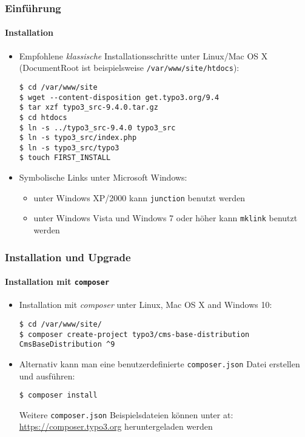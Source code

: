 \begin{frame}[fragile]
	\frametitle{Einführung}
	\framesubtitle{Installation}

	\begin{itemize}
		\item Empfohlene \textit{klassische} Installationsschritte unter Linux/Mac OS X\newline
			(DocumentRoot ist beispielsweise \texttt{/var/www/site/htdocs}):
		\begin{lstlisting}
$ cd /var/www/site
$ wget --content-disposition get.typo3.org/9.4
$ tar xzf typo3_src-9.4.0.tar.gz
$ cd htdocs
$ ln -s ../typo3_src-9.4.0 typo3_src
$ ln -s typo3_src/index.php
$ ln -s typo3_src/typo3
$ touch FIRST_INSTALL
		\end{lstlisting}

		\item Symbolische Links unter Microsoft Windows:

			\begin{itemize}
				\item unter Windows XP/2000 kann \texttt{junction} benutzt werden 
				\item unter Windows Vista und Windows 7 oder höher kann \texttt{mklink} benutzt werden
			\end{itemize}

	\end{itemize}
\end{frame}


\begin{frame}[fragile]
	\frametitle{Installation und Upgrade}
	\framesubtitle{Installation mit \texttt{composer}}

	\begin{itemize}
		\item Installation mit \textit{composer} unter Linux, Mac OS X and Windows 10:

			\begin{lstlisting}
$ cd /var/www/site/
$ composer create-project typo3/cms-base-distribution CmsBaseDistribution ^9
			\end{lstlisting}

		\item Alternativ kann man eine benutzerdefinierte \texttt{composer.json} Datei erstellen und ausführen:

			\begin{lstlisting}
$ composer install
			\end{lstlisting}

			Weitere \texttt{composer.json} Beispielsdateien können unter at:\newline
			\smaller
				\href{https://composer.typo3.org}{https://composer.typo3.org} heruntergeladen werden
			\normalsize

	\end{itemize}
\end{frame}

